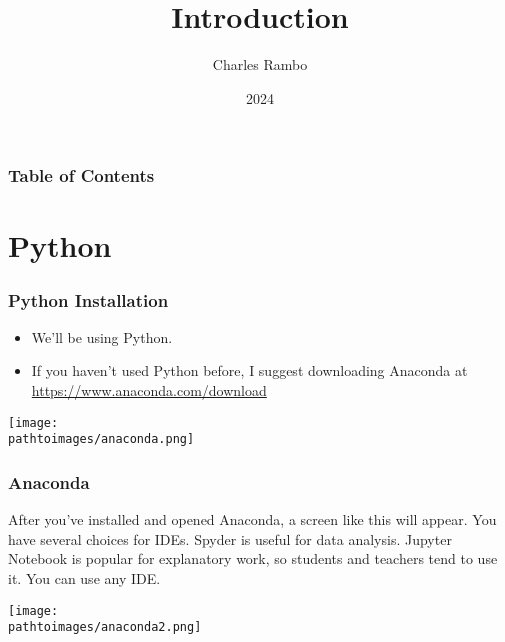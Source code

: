 \documentclass{beamer}
\title{Introduction}
\author{Charles Rambo}
\institute{UCLA Anderson School of Management}
\date{2024}
\newcommand{\pathtoimages}{/Users/charlesrambo/Desktop/Bootcamp24/Images}
\begin{document}


\insertTitleSlide

\frame{\titlepage}

\begin{frame}

\frametitle{Table of Contents}
\tableofcontents
\end{frame}

\section{Python}

\begin{frame}
\frametitle{Python Installation}
\begin{itemize}
\item We'll be using Python.
\item If you haven't used Python before, I suggest downloading Anaconda at  \url{https://www.anaconda.com/download}
\end{itemize}
\begin{center}
\texttt{[image: \\pathtoimages/anaconda.png]}
\end{center}
\end{frame}

\begin{frame}
\frametitle{Anaconda}

After you've installed and opened Anaconda, a screen like this will appear. You have several choices for IDEs. Spyder is useful for data analysis. Jupyter Notebook is popular for explanatory work, so students and teachers tend to use it. You can use any IDE.
\begin{center}
\texttt{[image: \\pathtoimages/anaconda2.png]}
\end{center}
\end{frame}


\end{document}
